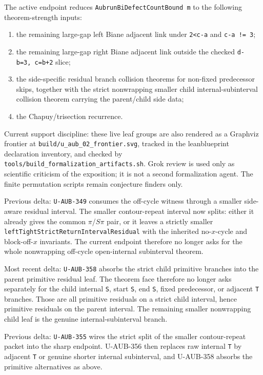 \documentclass[
]{article}
\providecommand{\tightlist}{%
  \setlength{\itemsep}{0pt}\setlength{\parskip}{0pt}}
\begin{document}
The active endpoint reduces \texttt{AubrunBiDefectCountBound\ m} to the
following theorem-strength inputs:

\begin{enumerate}
\def\labelenumi{\arabic{enumi}.}
\tightlist
\item
  the remaining large-gap left Biane adjacent link under
  \texttt{2\textless{}c-a} and \texttt{c-a\ !=\ 3};
\item
  the remaining large-gap right Biane adjacent link outside the checked
  \texttt{d-b=3,\ c=b+2} slice;
\item
  the side-specific residual branch collision theorems for non-fixed
  predecessor skips, together with the strict nonwrapping smaller child
  internal-subinterval collision theorem carrying the parent/child side
  data;
\item
  the Chapuy/trisection recurrence.
\end{enumerate}

Current support discipline: these live leaf groups are also rendered as
a Graphviz frontier at \texttt{build/u\_aub\_02\_frontier.svg}, tracked
in the leanblueprint declaration inventory, and checked by
\texttt{tools/build\_formalization\_artifacts.sh}. Grok review is used
only as scientific criticism of the exposition; it is not a second
formalization agent. The finite permutation scripts remain conjecture
finders only.

Previous delta: \texttt{U-AUB-349} consumes the off-cycle witness
through a smaller side-aware residual interval. The smaller
contour-repeat interval now splits: either it already gives the common
\(\pi\)/\(S\pi\) pair, or it leaves a strictly smaller
\texttt{leftTightStrictReturnIntervalResidual} with the inherited
no-\(x\)-cycle and block-off-\(x\) invariants. The current endpoint
therefore no longer asks for the whole nonwrapping off-cycle
open-internal subinterval theorem.

Most recent delta: \texttt{U-AUB-358} absorbs the strict child primitive
branches into the parent primitive residual leaf. The theorem face
therefore no longer asks separately for the child internal \texttt{S},
start \texttt{S}, end \texttt{S}, fixed predecessor, or adjacent
\texttt{T} branches. Those are all primitive residuals on a strict child
interval, hence primitive residuals on the parent interval. The
remaining smaller nonwrapping child leaf is the genuine
internal-subinterval branch.

Previous delta: \texttt{U-AUB-355} wires the strict split of the smaller
contour-repeat packet into the sharp endpoint. U-AUB-356 then replaces
raw internal \texttt{T} by adjacent \texttt{T} or genuine shorter
internal subinterval, and U-AUB-358 absorbs the primitive alternatives
as above.
\end{document}
